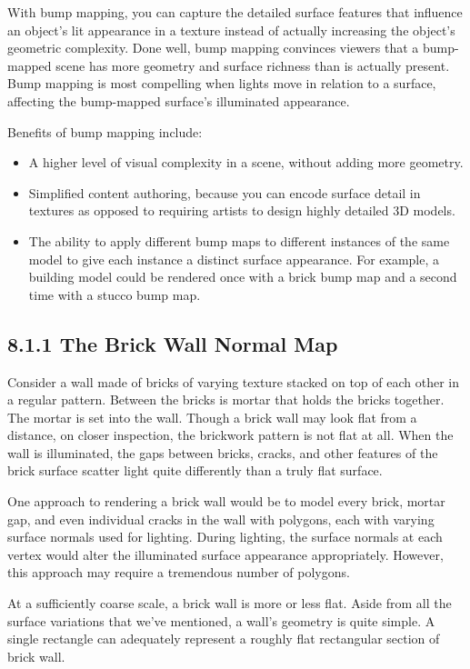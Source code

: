 \documentclass[../main.tex]{subfiles}
\begin{document}
With bump mapping, you can capture the detailed surface features that influence an object's lit appearance in a texture instead of actually increasing the object's geometric complexity. Done well, bump mapping convinces viewers that a bump-mapped scene has more geometry and surface richness than is actually present. Bump mapping is most compelling when lights move in relation to a surface, affecting the bump-mapped surface's illuminated appearance.

Benefits of bump mapping include:

\begin{itemize}
\item A higher level of visual complexity in a scene, without adding more geometry.
\item Simplified content authoring, because you can encode surface detail in textures as opposed to requiring artists to design highly detailed 3D models.
\item The ability to apply different bump maps to different instances of the same model to give each instance a distinct surface appearance. For example, a building model could be rendered once with a brick bump map and a second time with a stucco bump map.
\end{itemize}

\subsection{8.1.1 The Brick Wall Normal Map}

Consider a wall made of bricks of varying texture stacked on top of each other in a regular pattern. Between the bricks is mortar that holds the bricks together. The mortar is set into the wall. Though a brick wall may look flat from a distance, on closer inspection, the brickwork pattern is not flat at all. When the wall is illuminated, the gaps between bricks, cracks, and other features of the brick surface scatter light quite differently than a truly flat surface.

One approach to rendering a brick wall would be to model every brick, mortar gap, and even individual cracks in the wall with polygons, each with varying surface normals used for lighting. During lighting, the surface normals at each vertex would alter the illuminated surface appearance appropriately. However, this approach may require a tremendous number of polygons.

At a sufficiently coarse scale, a brick wall is more or less flat. Aside from all the surface variations that we've mentioned, a wall's geometry is quite simple. A single rectangle can adequately represent a roughly flat rectangular section of brick wall.
\end{document}
